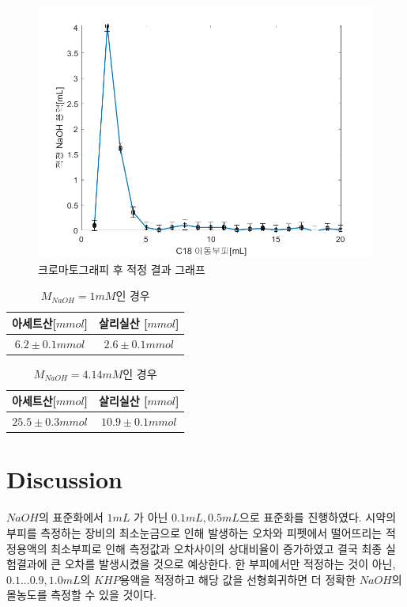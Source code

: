 \documentclass[%
 reprint,
 amsmath,amssymb,
 aps,
]{revtex4-2}
\begin{document}
\begin{figure}[htbp]
	\includegraphics[width = 0.95\linewidth]{C18.png}%
	\caption{\label{fig:C18}크로마토그래피 후 적정 결과 그래프}
\end{figure}

\begin{table}[]
\begin{tabular}{c|c} \hline \hline
아세트산[$mmol$] & 살리실산 [$mmol$] \\ \hline
$6.2\pm0.1mmol$ & $2.6\pm0.1mmol$  \\ \hline \hline
\end{tabular}
\caption{\label{tab:NAOH_1}$M_{NaOH} = 1mM$인 경우}
\end{table}

\begin{table}[]
\begin{tabular}{c|c} \hline \hline
아세트산[$mmol$] & 살리실산 [$mmol$] \\ \hline
$25.5\pm0.3mmol$ & $10.9\pm0.1mmol$  \\ \hline \hline
\end{tabular}
\caption{\label{tab:NAOH_4}$M_{NaOH} = 4.14mM$인 경우}
\end{table}

\section{\label{sec:level1}Discussion}
$NaOH$의 표준화에서 $1mL$ 가 아닌 $0.1mL, 0.5mL$으로 표준화를 진행하였다. 시약의 부피를 측정하는 장비의 최소눈금으로 인해 발생하는 오차와 피펫에서 떨어뜨리는 적정용액의 최소부피로 인해 측정값과 오차사이의 상대비율이 증가하였고 결국 최종 실험결과에 큰 오차를 발생시켰을 것으로 예상한다. 한 부피에서만 적정하는 것이 아닌, $0.1 ... 0.9, 1.0mL$의 $KHP$용액을 적정하고 해당 값을 선형회귀하면 더 정확한 $NaOH$의 몰농도를 측정할 수 있을 것이다.
\end{document}
